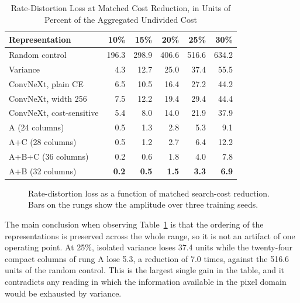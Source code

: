 \documentclass[conference]{IEEEtran}
\begin{document}
\begin{table}[!t]
\renewcommand{\arraystretch}{1.3}
\caption{Rate-Distortion Loss at Matched Cost Reduction, in Units of
 Percent of the Aggregated Undivided Cost}
\label{tab_frontier}
\centering
\begin{tabular}{lrrrrr}
\hline
\textbf{Representation} & \textbf{10\%} & \textbf{15\%} & \textbf{20\%}
& \textbf{25\%} & \textbf{30\%} \\
\hline
Random control & 196.3 & 298.9 & 406.6 & 516.6 & 634.2 \\
Variance & 4.3 & 12.7 & 25.0 & 37.4 & 55.5 \\
ConvNeXt, plain CE & 6.5 & 10.5 & 16.4 & 27.2 & 44.2 \\
ConvNeXt, width 256 & 7.5 & 12.2 & 19.4 & 29.4 & 44.4 \\
ConvNeXt, cost-sensitive & 5.4 & 8.0 & 14.0 & 21.9 & 37.9 \\
A (24 columns) & 0.5 & 1.3 & 2.8 & 5.3 & 9.1 \\
A+C (28 columns) & 0.5 & 1.2 & 2.7 & 6.4 & 12.2 \\
A+B+C (36 columns) & 0.2 & 0.6 & 1.8 & 4.0 & 7.8 \\
A+B (32 columns) & \textbf{0.2} & \textbf{0.5} & \textbf{1.5} & \textbf{3.3}
& \textbf{6.9} \\
\hline
\end{tabular}
\end{table}

\begin{figure}[!t]
\centering
\caption{Rate-distortion loss as a function of matched search-cost reduction. Bars
on the rungs show the amplitude over three training seeds.}
\label{fig_frontier}
\end{figure}

The main conclusion when observing Table~\ref{tab_frontier} is that the ordering
of the representations is preserved across the whole range, so it is not an
artifact of one operating point. At 25\%, isolated variance loses 37.4
units while the twenty-four compact columns of rung A lose 5.3, a reduction of 7.0
times, against the 516.6 units of the random control. This is the largest single
gain in the table, and it contradicts any reading in which the information
available in the pixel domain would be exhausted by variance.
\end{document}
